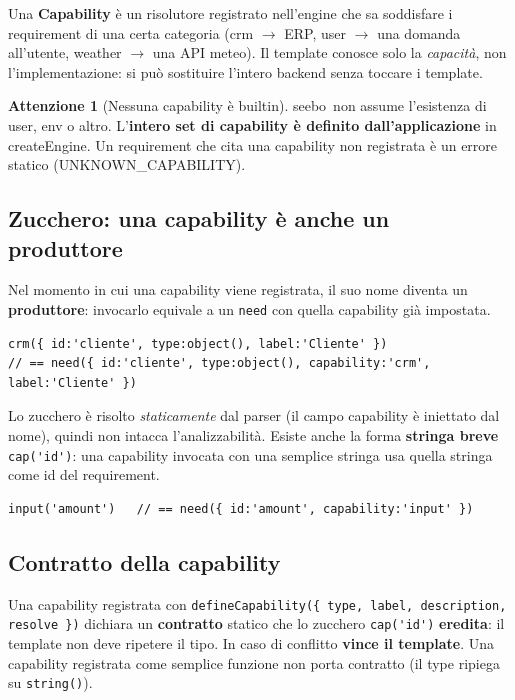 \documentclass[11pt,a4paper]{book}
\let\code\lstinline
\newcommand{\ic}[1]{{\ttfamily #1}}
\theoremstyle{definition}
\newtheorem*{attenzione}{Attenzione}
\newcommand{\seebo}{\textsf{seebo}}
\begin{document}
{{{{Una \textbf{Capability} è un risolutore registrato nell'engine che sa soddisfare i
requirement di una certa categoria (\ic{crm} $\rightarrow$ ERP, \ic{user}
$\rightarrow$ una domanda all'utente, \ic{weather} $\rightarrow$ una API meteo). Il
template conosce solo la \emph{capacità}, non l'implementazione: si può sostituire
l'intero backend senza toccare i template.

\begin{attenzione}[Nessuna capability è builtin]
\seebo\ non assume l'esistenza di \ic{user}, \ic{env} o altro. L'\textbf{intero set
di capability è definito dall'applicazione} in \ic{createEngine}. Un requirement
che cita una capability non registrata è un errore statico
(\ic{UNKNOWN\_CAPABILITY}).
\end{attenzione}

\subsection{Zucchero: una capability è anche un produttore}

Nel momento in cui una capability viene registrata, il suo nome diventa un
\textbf{produttore}: invocarlo equivale a un \code|need| con quella
\ic{capability} già impostata.

\begin{lstlisting}
crm({ id:'cliente', type:object(), label:'Cliente' })
// == need({ id:'cliente', type:object(), capability:'crm', label:'Cliente' })
\end{lstlisting}

Lo zucchero è risolto \emph{staticamente} dal parser (il campo \ic{capability} è
iniettato dal nome), quindi non intacca l'analizzabilità. Esiste anche la forma
\textbf{stringa breve} \code|cap('id')|: una capability invocata con una semplice
stringa usa quella stringa come \ic{id} del requirement.

\begin{lstlisting}
input('amount')   // == need({ id:'amount', capability:'input' })
\end{lstlisting}

\subsection{Contratto della capability}

Una capability registrata con \code|defineCapability({ type, label, description, resolve })|
dichiara un \textbf{contratto} statico che lo zucchero \code|cap('id')|
\textbf{eredita}: il template non deve ripetere il tipo. In caso di conflitto
\textbf{vince il template}. Una capability registrata come semplice funzione non
porta contratto (il \ic{type} ripiega su \code|string()|).

}}}}
\end{document}
